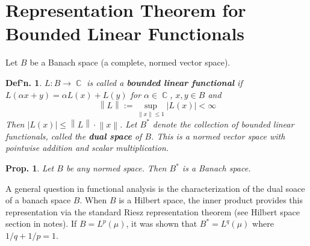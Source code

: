 \documentclass[12pt, a4paper]{book}
\DeclareMathOperator{\C}{\mathbb{C}}
\newcommand{\norm}[1]{\left\lVert#1\right\rVert} %
\newtheorem{definition}[theorem]{Def'n.}
\newtheorem{proposition}[theorem]{Prop.}
\theoremstyle{nonumberplain}
\begin{document}
\section{Representation Theorem for Bounded Linear Functionals}
Let $B$ be a Banach space (a complete, normed vector space).
\begin{definition}
    $L:B\to\C$ is called a \textbf{bounded linear functional} if $L(\alpha x+y)=\alpha L(x)+L(y)$ for $\alpha\in\C$, $x,y\in B$ and
    \[\norm{L}:=\sup_{\norm{x}\leq 1}|L(x)|<\infty\]
    Then $|L(x)|\leq\norm{L}\cdot\norm{x}$.
    Let $B^*$ denote the collection of bounded linear functionals, called the \textbf{dual space} of $B$.
    This is a normed vector space with pointwise addition and scalar multiplication.
\end{definition}
\begin{proposition}
    Let $B$ be any normed space.
    Then $B^*$ is a Banach space.
\end{proposition}
A general question in functional analysis is the characterization of the dual soace of a banach space $B$.
When $B$ is a Hilbert space, the inner product provides this representation via the standard Riesz representation theorem (see Hilbert space section in notes).
If $B=L^p(\mu)$, it was shown that $B^*=L^q(\mu)$ where $1/q+1/p=1$.
\end{document}
